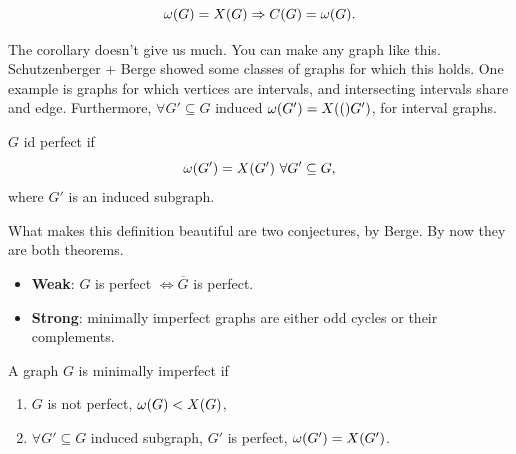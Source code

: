 \begin{cor}
 $$\omega(G) = X(G) \Rightarrow C(G) = \omega(G).$$
\end{cor}

The corollary doesn't give us much. You can make any graph like this. Schutzenberger + Berge showed some classes of graphs for which this holds. One example is graphs for which vertices are intervals, and intersecting intervals share and edge. Furthermore, $\forall G' \subseteq G$ induced $\omega(G') = X(()G')$, for interval graphs.

\begin{definition}
 $G$ id perfect if $$\omega(G') = \chrom{G'}\ \forall G' \subseteq G,$$ where $G'$ is an induced subgraph.
\end{definition}

What makes this definition beautiful are two conjectures, by Berge. By now they are both theorems.
\begin{itemize}
 \item \textbf{Weak}: $G$ is perfect $\Leftrightarrow \overline{G}$ is perfect.
 \item \textbf{Strong}: minimally imperfect graphs are either odd cycles or their complements.
\end{itemize}

\begin{definition}
 A graph $G$ is minimally imperfect if
 \begin{enumerate}
  \item $G$ is not perfect, \ie $\omega(G) < X(G)$,
  \item $\forall G' \subseteq G$ induced subgraph, $G'$ is perfect, \ie $\omega(G') = X(G')$.
 \end{enumerate}

\end{definition}




